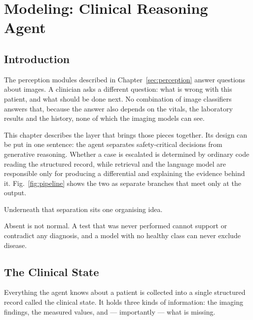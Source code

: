 %
\section{Modeling: Clinical Reasoning Agent}
\label{sec:reasoning}

\subsection{Introduction}

The perception modules described in Chapter~\ref{sec:perception} answer questions about
images. A clinician asks a different question: what is wrong with this patient, and what
should be done next. No combination of image classifiers answers that, because the answer
also depends on the vitals, the laboratory results and the history, none of which the
imaging models can see.

This chapter describes the layer that brings those pieces together. Its design can be put
in one sentence: the agent separates safety-critical decisions from generative reasoning.
Whether a case is escalated is determined by ordinary code reading the structured record,
while retrieval and the language model are responsible only for producing a differential
and explaining the evidence behind it. Fig.~\ref{fig:pipeline} shows the two as separate
branches that meet only at the output.

Underneath that separation sits one organising idea.

\begin{keystatement}
Absent is not normal. A test that was never performed cannot support or contradict any
diagnosis, and a model with no healthy class can never exclude disease.
\end{keystatement}

\subsection{The Clinical State}
\label{subsec:clinical-state}

Everything the agent knows about a patient is collected into a single structured record
called the clinical state. It holds three kinds of information: the imaging findings, the
measured values, and --- importantly --- what is missing.

